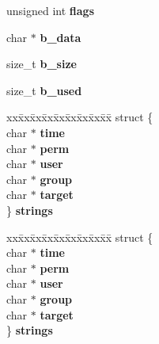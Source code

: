 \begin{DoxyCompactItemize}
\begin{tabbing}
\end{tabbing}\item 
\mbox{\label{structcurl__fileinfo_a4db8370a5202c50f4e3cf57bc0002c79}} 
unsigned int {\bfseries flags}
\item 
\mbox{\label{structcurl__fileinfo_afb9b05466b0690f6a47093e19013ef83}} 
char $\ast$ {\bfseries b\+\_\+data}
\item 
\mbox{\label{structcurl__fileinfo_a4831476a8e9e0af283275d04cc2b4108}} 
size\+\_\+t {\bfseries b\+\_\+size}
\item 
\mbox{\label{structcurl__fileinfo_a35a78449a69e80e8c1d28449fcae89b9}} 
size\+\_\+t {\bfseries b\+\_\+used}
\item 
\mbox{\label{structcurl__fileinfo_af187138acbdda6f3d9a81f496fb04593}} 
\begin{tabbing}
xx\=xx\=xx\=xx\=xx\=xx\=xx\=xx\=xx\=\kill
struct \{\\
\>char $\ast$ {\bfseries time}\\
\>char $\ast$ {\bfseries perm}\\
\>char $\ast$ {\bfseries user}\\
\>char $\ast$ {\bfseries group}\\
\>char $\ast$ {\bfseries target}\\
\} {\bfseries strings}\\

\end{tabbing}\item 
\mbox{\label{structcurl__fileinfo_a54d3b7db3ae8f4193d2fb1bfbcf4414a}} 
\begin{tabbing}
xx\=xx\=xx\=xx\=xx\=xx\=xx\=xx\=xx\=\kill
struct \{\\
\>char $\ast$ {\bfseries time}\\
\>char $\ast$ {\bfseries perm}\\
\>char $\ast$ {\bfseries user}\\
\>char $\ast$ {\bfseries group}\\
\>char $\ast$ {\bfseries target}\\
\} {\bfseries strings}\\


\end{tabbing}
\end{DoxyCompactItemize}
